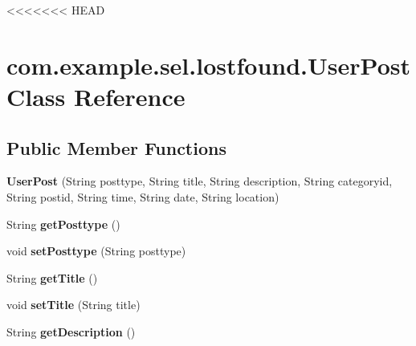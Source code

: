 <<<<<<< HEAD
\hypertarget{classcom_1_1example_1_1sel_1_1lostfound_1_1UserPost}{\section{com.\-example.\-sel.\-lostfound.\-User\-Post Class Reference}
\label{classcom_1_1example_1_1sel_1_1lostfound_1_1UserPost}
}
\subsection*{Public Member Functions}
\begin{DoxyCompactItemize}
\item 
\hypertarget{classcom_1_1example_1_1sel_1_1lostfound_1_1UserPost_a115af0c6a558f34125aa8bedc5edf6a1}{{\bfseries User\-Post} (String posttype, String title, String description, String categoryid, String postid, String time, String date, String location)}\label{classcom_1_1example_1_1sel_1_1lostfound_1_1UserPost_a115af0c6a558f34125aa8bedc5edf6a1}

\item 
\hypertarget{classcom_1_1example_1_1sel_1_1lostfound_1_1UserPost_abda6328cdfe66f43f6ffdf73b87d91c6}{String {\bfseries get\-Posttype} ()}\label{classcom_1_1example_1_1sel_1_1lostfound_1_1UserPost_abda6328cdfe66f43f6ffdf73b87d91c6}

\item 
\hypertarget{classcom_1_1example_1_1sel_1_1lostfound_1_1UserPost_a2123e2a801f39239ad7713e4df64d603}{void {\bfseries set\-Posttype} (String posttype)}\label{classcom_1_1example_1_1sel_1_1lostfound_1_1UserPost_a2123e2a801f39239ad7713e4df64d603}

\item 
\hypertarget{classcom_1_1example_1_1sel_1_1lostfound_1_1UserPost_a7ca77f66b088c6ffe832467a90e52dfd}{String {\bfseries get\-Title} ()}\label{classcom_1_1example_1_1sel_1_1lostfound_1_1UserPost_a7ca77f66b088c6ffe832467a90e52dfd}

\item 
\hypertarget{classcom_1_1example_1_1sel_1_1lostfound_1_1UserPost_a1ffca3ecc26e1663951a11d830af73f6}{void {\bfseries set\-Title} (String title)}\label{classcom_1_1example_1_1sel_1_1lostfound_1_1UserPost_a1ffca3ecc26e1663951a11d830af73f6}

\item 
\hypertarget{classcom_1_1example_1_1sel_1_1lostfound_1_1UserPost_a356b052bdfc18ab0ece0661ad66a86a0}{String {\bfseries get\-Description} ()}\label{classcom_1_1example_1_1sel_1_1lostfound_1_1UserPost_a356b052bdfc18ab0ece0661ad66a86a0}


\end{DoxyCompactItemize}

